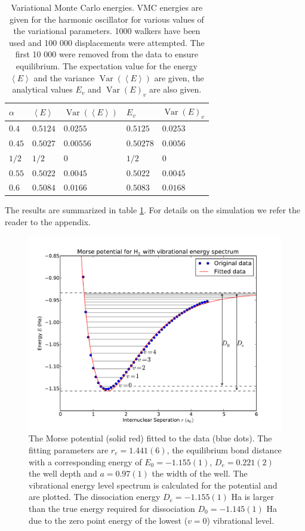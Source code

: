 \documentclass{article}
\begin{document}
\begin{table}
\caption{Variational Monte Carlo energies. VMC energies are given for the harmonic oscillator for various values of the variational parameters. 1000 walkers have been used and 100 000 displacements were attempted. The first 10 000 were removed from the data to ensure equilibrium. The expectation value for the energy $\left\langle E \right\rangle$ and the variance $\operatorname{Var}(\left\langle E \right\rangle)$ are given, the analytical values $E_v$ and $\operatorname{Var}(E)_v$ are also given.}
\label{table:HO}
\centering
\begin{tabular}{lllll}
\toprule
$\alpha$ & $\left\langle E \right\rangle$ & $\operatorname{Var}(\left\langle E \right\rangle)$ & $E_v$ & $\operatorname{Var}(E)_v$ \\
\midrule
$0.4$  & $0.5124$ & $0.0255$  & $0.5125$  & $0.0253$ \\
$0.45$ & $0.5027$ & $0.00556$ & $0.50278$ & $0.0056$\\
$1/2$  & $1/2$    & 0         & $1/2$     & 0 \\
$0.55$ & $0.5022$ & $0.0045$  & $0.5022$  & $0.0045$\\
$0.6$  & $0.5084$ & $0.0166$  & $0.5083$  & $0.0168$ \\ 
\bottomrule
\end{tabular}
\end{table}

The results are summarized in table \ref{table:HO}. For details on the simulation we refer the reader to the appendix. \\

\begin{figure}
 \centering
 \includegraphics[width=\linewidth]{plot.pdf}
 \caption{The Morse potential (solid red) fitted to the data (blue dots). The fitting parameters are $r_e=1.441(6)$, the equilibrium bond distance with a corresponding energy of $E_0=-1.155(1)$, $D_e=0.221(2)$ the well depth and $a=0.97(1)$ the width of the well. The vibrational energy level spectrum is calculated for the potential and are plotted. The dissociation energy $D_e=-1.155(1)$ Ha is larger than the true energy required for dissociation $D_0=-1.145(1)$ Ha due to the zero point energy of the lowest ($v = 0$) vibrational level.}\label{fig:plot}
\end{figure}
\end{document}
